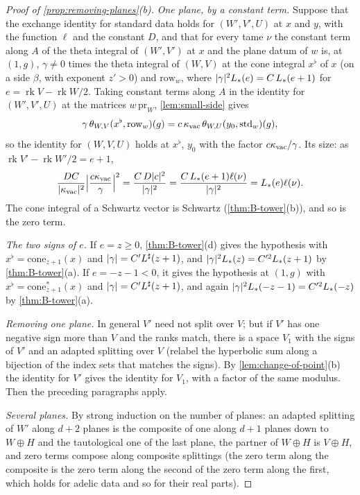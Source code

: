 \begin{proof}[Proof of \cref{prop:removing-planes}(b)]
\emph{One plane, by a constant term.} Suppose that the exchange identity for standard data holds for $(W',V',U)$ at $x$ and $y$, with the function $\ell$ and the constant $D$, and that for every tame $\nu$ the constant term along $A$ of the theta integral of $(W',V')$ at $x$ and the
plane datum of $w$ is, at $(1,g)$, $\gamma\ne0$ times the theta integral of $(W,V)$ at the cone integral $x^\flat$ of $x$ (on a side $\beta$, with exponent $z'>0$) and $\mathrm{row}_w$, where
$\lvert \gamma\rvert^2L_*(e)=C\,L_*(e+1)$ for $e=\operatorname{rk}V-\operatorname{rk}W/2$. Taking constant terms along $A$ in the identity for $(W',V',U)$ at the matrices $w\,\mathrm{pr}_W$, \cref{lem:small-side} gives
\[
  \gamma\,\theta_{W,V}(x^\flat,\mathrm{row}_w)(g)=c\,\kappa_{\rm vac}\,\theta_{W,U}(y_0,\mathrm{std}_w)(g),
\]
so the identity for $(W,V,U)$ holds at $x^\flat$, $y_0$ with the factor $c\kappa_{\rm vac}/\gamma$. Its size: as $\operatorname{rk}V'-\operatorname{rk}W'/2=e+1$,
\[
  \frac{DC}{\lvert \kappa_{\rm vac}\rvert^2}\Bigl\lvert\frac{c\kappa_{\rm vac}}\gamma\Bigr\rvert^2=\frac{C\,D\lvert c\rvert^2}{\lvert \gamma\rvert^2}=\frac{C\,L_*(e+1)\ell(\nu)}{\lvert \gamma\rvert^2}=L_*(e)\ell(\nu).
\]
The cone integral of a Schwartz vector is Schwartz (\cref{thm:B-tower}(b)), and so is the zero term.

\emph{The two signs of $e$.} If $e=z\ge0$, \cref{thm:B-tower}(d) gives the hypothesis with $x^\flat=\mathrm{cone}_{z+1}(x)$ and $\lvert \gamma\rvert=C'L^\sharp(z+1)$, and $\lvert \gamma\rvert^2L_*(z)=C'^2L_*(z+1)$ by
\cref{thm:B-tower}(a). If $e=-z-1<0$, it gives the hypothesis at $(1,g)$ with $x^\flat=\mathrm{cone}^*_{z+1}(x)$ and $\lvert \gamma\rvert=C'L^\sharp(z+1)$, and again $\lvert \gamma\rvert^2L_*(-z-1)=C'^2L_*(-z)$ by \cref{thm:B-tower}(a).

\emph{Removing one plane.} In general $V'$ need not split over $V$; but if $V'$ has one negative sign more than $V$ and the ranks match, there is a space $V_1$ with the signs of $V'$ and an adapted splitting over
$V$ (relabel the hyperbolic sum along a bijection of the index sets that matches the signs). By \cref{lem:change-of-point}(b) the identity for $V'$ gives the identity for $V_1$, with a factor of the same
modulus. Then the preceding paragraphs apply.

\emph{Several planes.} By strong induction on the number of planes: an adapted splitting of $W'$ along $d+2$ planes is the composite of one along $d+1$ planes down to $W\oplus H$ and the tautological one of the last
plane, the partner of $W\oplus H$ is $V\oplus H$, and zero terms compose along composite splittings (the zero term along the composite is the zero term along the second of the zero term along the first,
which holds for adelic data and so for their real parts).
\end{proof}

